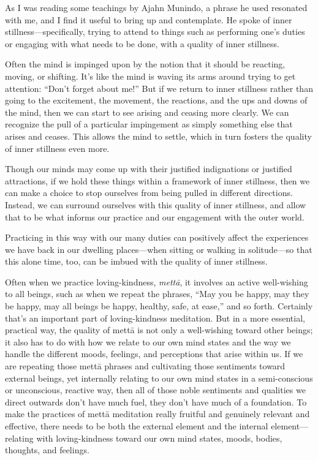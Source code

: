 
As I was reading some teachings by Ajahn Munindo, a phrase he used 
resonated with me, and I find it useful to bring up and contemplate. He 
spoke of inner stillness---specifically, trying to attend to things 
such as performing one's duties or engaging with what needs to be done, 
with a quality of inner stillness.

Often the mind is impinged upon by the notion that it should be 
reacting, moving, or shifting. It's like the mind is waving its arms 
around trying to get attention: ``Don't forget about me!'' But if we 
return to inner stillness rather than going to the excitement, the 
movement, the reactions, and the ups and downs of the mind, then we can 
start to see arising and ceasing more clearly. We can recognize the 
pull of a particular impingement as simply something else that arises 
and ceases. This allows the mind to settle, which in turn fosters the 
quality of inner stillness even more.

Though our minds may come up with their justified indignations or 
justified attractions, if we hold these things within a framework of 
inner stillness, then we can make a choice to stop ourselves from being 
pulled in different directions. Instead, we can surround ourselves with 
this quality of inner stillness, and allow that to be what informs our 
practice and our engagement with the outer world.

Practicing in this way with our many duties can positively affect the 
experiences we have back in our dwelling places---when sitting or 
walking in solitude---so that this alone time, too, can be imbued with 
the quality of inner stillness.


Often when we practice loving-kindness, \emph{mettā}, it involves an 
active well-wishing to all beings, such as when we repeat the phrases, 
``May you be happy, may they be happy, may all beings be happy, 
healthy, safe, at ease,'' and so forth. Certainly that's an important 
part of loving-kindness meditation. But in a more essential, practical 
way, the quality of mettā is not only a well-wishing toward other 
beings; it also has to do with how we relate to our own mind states and 
the way we handle the different moods, feelings, and perceptions that 
arise within us. If we are repeating those mettā phrases and 
cultivating those sentiments toward external beings, yet internally 
relating to our own mind states in a semi-conscious or unconscious, 
reactive way, then all of those noble sentiments and qualities we 
direct outwards don't have much fuel, they don't have much of a 
foundation. To make the practices of mettā meditation really fruitful 
and genuinely relevant and effective, there needs to be both the 
external element and the internal element---relating with 
loving-kindness toward our own mind states, moods, bodies, thoughts, 
and feelings.

